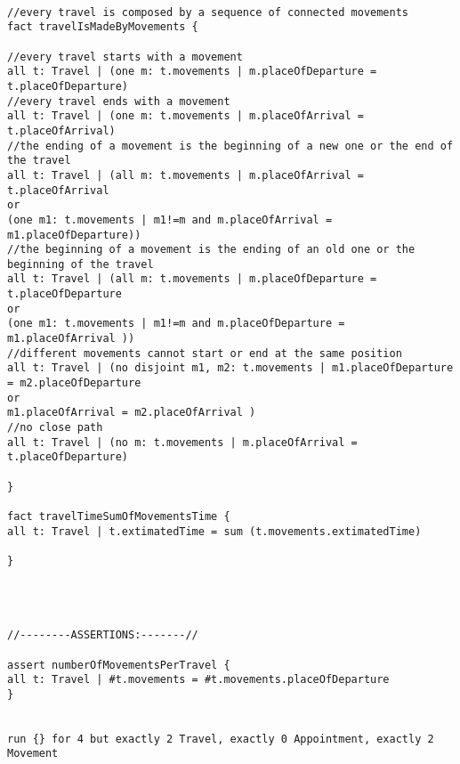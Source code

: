 \begin{lstlisting}

//every travel is composed by a sequence of connected movements
fact travelIsMadeByMovements {

//every travel starts with a movement
all t: Travel | (one m: t.movements | m.placeOfDeparture = t.placeOfDeparture)
//every travel ends with a movement
all t: Travel | (one m: t.movements | m.placeOfArrival = t.placeOfArrival)
//the ending of a movement is the beginning of a new one or the end of the travel
all t: Travel | (all m: t.movements | m.placeOfArrival = t.placeOfArrival 
or
(one m1: t.movements | m1!=m and m.placeOfArrival = m1.placeOfDeparture))
//the beginning of a movement is the ending of an old one or the beginning of the travel
all t: Travel | (all m: t.movements | m.placeOfDeparture = t.placeOfDeparture 
or
(one m1: t.movements | m1!=m and m.placeOfDeparture = m1.placeOfArrival ))
//different movements cannot start or end at the same position
all t: Travel | (no disjoint m1, m2: t.movements | m1.placeOfDeparture = m2.placeOfDeparture
or
m1.placeOfArrival = m2.placeOfArrival )
//no close path
all t: Travel | (no m: t.movements | m.placeOfArrival = t.placeOfDeparture)

}

fact travelTimeSumOfMovementsTime {
all t: Travel | t.extimatedTime = sum (t.movements.extimatedTime)

}




//--------ASSERTIONS:-------//

assert numberOfMovementsPerTravel {
all t: Travel | #t.movements = #t.movements.placeOfDeparture
}	


run {} for 4 but exactly 2 Travel, exactly 0 Appointment, exactly 2 Movement
\end{lstlisting}